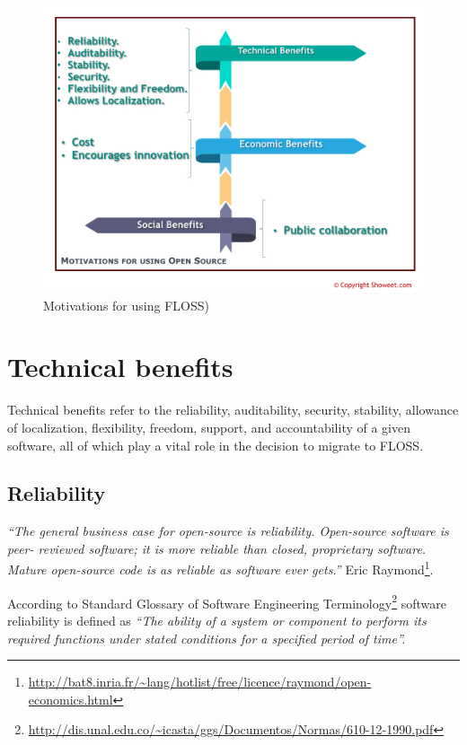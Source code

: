   \begin{figure}
  \centering
      \includegraphics[scale=0.6,angle=90]{img/motivation.png}
    \caption{Motivations for using FLOSS)}
    \label{fig:Motivations}
  \end{figure}

 \section{Technical benefits}

 Technical benefits refer to the reliability, auditability, security, stability, allowance of localization, flexibility, freedom, support, and accountability of a given software, all of which play a vital role in the decision to migrate to FLOSS.


 \subsection {Reliability}
 \textit{``The general business case for open-source is reliability. Open-source software is peer- reviewed software; it is more reliable than closed, proprietary software. Mature open-source code is as reliable as software ever gets.''}
  Eric Raymond\footnote{\url{http://bat8.inria.fr/~lang/hotlist/free/licence/raymond/open-economics.html}}.

 According to Standard Glossary of Software Engineering Terminology\footnote{ \url {http://dis.unal.edu.co/~icasta/ggs/Documentos/Normas/610-12-1990.pdf}} software reliability is defined as \textit{``The ability of a system or component to perform its required functions under stated conditions for a specified period of time''.}

